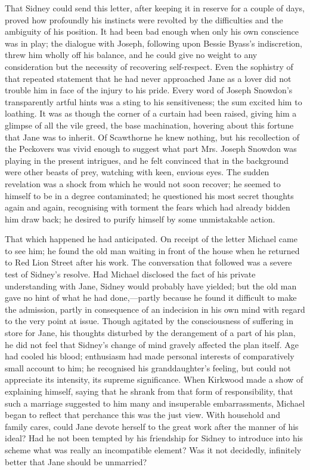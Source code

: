 That Sidney could send this letter, after keeping it in reserve for a
couple of days, proved how profoundly his instincts were revolted by the
difficulties and the ambiguity of his position. It had been bad enough
when only his own conscience was in play; the dialogue with Joseph,
following upon Bessie Byass's indiscretion, threw him wholly off his
balance, and he could give no weight to any consideration but the
necessity of recovering self-respect. Even the sophistry of that
repeated statement that he had never approached Jane as a lover did not
trouble him in face of the injury to his pride. Every {}word of Joseph
Snowdon's transparently artful hints was a sting to his sensitiveness;
the sum excited him to loathing. It was as though the corner of a
curtain had been raised, giving him a glimpse of all the vile greed, the
base machination, hovering about this fortune that Jane was to inherit.
Of Scawthorne he knew nothing, but his recollection of the Peckovers was
vivid enough to suggest what part Mrs. Joseph Snowdon was playing in the
present intrigues, and he felt convinced that in the background were
other beasts of prey, watching with keen, envious eyes. The sudden
revelation was a shock from which he would not soon recover; he seemed
to himself to be in a degree contaminated; he questioned his most secret
thoughts again and again, recognising with torment the fears which had
already bidden him draw back; he desired to purify himself by some
unmistakable action.

That which happened he had anticipated. On receipt of the letter Michael
came to see him; he found the old man waiting in front of the house when
he returned to Red Lion Street after his work. The conversation that
followed {}was a severe test of Sidney's resolve. Had Michael disclosed
the fact of his private understanding with Jane, Sidney would probably
have yielded; but the old man gave no hint of what he had done,---partly
because he found it difficult to make the admission, partly in
consequence of an indecision in his own mind with regard to the very
point at issue. Though agitated by the consciousness of suffering in
store for Jane, his thoughts disturbed by the derangement of a part of
his plan, he did not feel that Sidney's change of mind gravely affected
the plan itself. Age had cooled his blood; enthusiasm had made personal
interests of comparatively small account to him; he recognised his
granddaughter's feeling, but could not appreciate its intensity, its
supreme significance. When Kirkwood made a show of explaining himself,
saying that he shrank from that form of responsibility, that such a
marriage suggested to him many and insuperable embarrassments, Michael
began to reflect that perchance this was the just view. With household
and family cares, could Jane devote herself to the great work after the
manner of his ideal? Had he not been tempted by {}his friendship for
Sidney to introduce into his scheme what was really an incompatible
element? Was it not decidedly, infinitely better that Jane should be
unmarried?


